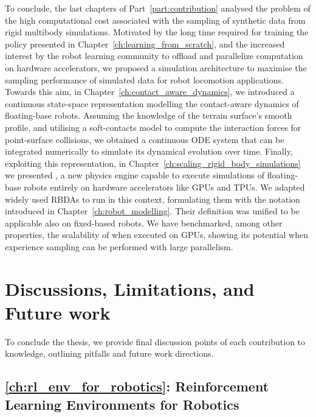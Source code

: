 To conclude, the last chapters of Part~\ref{part:contribution} analysed the problem of the high computational cost associated with the sampling of synthetic data from rigid multibody simulations.
Motivated by the long time required for training the policy presented in Chapter~\ref{ch:learning_from_scratch}, and the increased interest by the robot learning community to offload and parallelize computation on hardware accelerators, we proposed a simulation architecture to maximise the sampling performance of simulated data for robot locomotion applications.
Towards this aim, in Chapter~\ref{ch:contact_aware_dynamics}, we introduced a continuous state-space representation modelling the contact-aware dynamics of floating-base robots.
Assuming the knowledge of the terrain surface's smooth profile, and utilising a soft-contacts model to compute the interaction forces for point-surface collisions, we obtained a continuous \acs{ODE} system that can be integrated numerically to simulate its dynamical evolution over time.
Finally, exploiting this representation, in Chapter~\ref{ch:scaling_rigid_body_simulations} we presented \jaxsim, a new physics engine capable to execute simulations of floating-base robots entirely on hardware accelerators like \acsp{GPU} and \acsp{TPU}.
We adapted widely used \aclp{RBDA} to run in this context, formulating them with the notation introduced in Chapter~\ref{ch:robot_modelling}.
Their definition was unified to be applicable also on fixed-based robots.
We have benchmarked, among other properties, the scalability of \jaxsim when executed on \acp{GPU}, showing its potential when experience sampling can be performed with large parallelism.

\section*{Discussions, Limitations, and Future work}

To conclude the thesis, we provide final discussion points of each contribution to knowledge, outlining pitfalls and future work directions.

\subsection*{\autoref{ch:rl_env_for_robotics}: Reinforcement Learning Environments for Robotics}

